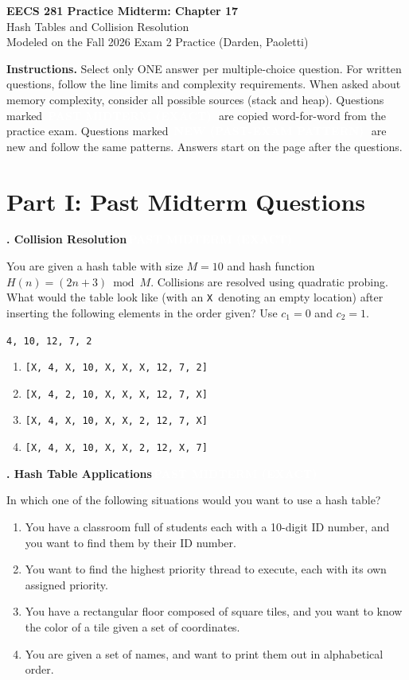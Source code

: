 \documentclass[11pt]{article}
\newcommand{\pasttag}{\colorbox{pastc}{\textcolor{white}{\scriptsize\textbf{\,PAST MIDTERM (EXACT)\,}}}}
\newcommand{\newtag}{\colorbox{newc}{\textcolor{white}{\scriptsize\textbf{\,NEW (PAST-EXAM PATTERN)\,}}}}
\newcommand{\X}{\texttt{X}}
\newcounter{q}
\newcommand{\question}[2]{\vspace{8pt}\refstepcounter{q}\textbf{\arabic{q}. #1}\hfill #2\par}
\begin{document}
\begin{center}
{\LARGE\bfseries EECS 281 Practice Midterm: Chapter 17}\\[3pt]
{\large Hash Tables and Collision Resolution}\\[3pt]
{\small Modeled on the Fall 2026 Exam 2 Practice (Darden, Paoletti)}
\end{center}

\textbf{Instructions.} Select only ONE answer per multiple-choice question. For written questions, follow the
line limits and complexity requirements. When asked about memory complexity, consider all possible sources (stack and heap).
Questions marked \pasttag\ are copied word-for-word from the practice exam. Questions marked \newtag\ are new and follow the same patterns.
Answers start on the page after the questions.

\section*{Part I: Past Midterm Questions}

\question{Collision Resolution}{\pasttag}
You are given a hash table with size $M = 10$ and hash function $H(n) = (2n + 3) \bmod M$. Collisions
are resolved using quadratic probing. What would the table look like (with an \X\ denoting an empty
location) after inserting the following elements in the order given? Use $c_1 = 0$ and $c_2 = 1$.

\centerline{\texttt{4, 10, 12, 7, 2}}
\begin{enumerate}
  \item \texttt{[X, 4, X, 10, X, X, X, 12, 7, 2]}
  \item \texttt{[X, 4, 2, 10, X, X, X, 12, 7, X]}
  \item \texttt{[X, 4, X, 10, X, X, 2, 12, 7, X]}
  \item \texttt{[X, 4, X, 10, X, X, 2, 12, X, 7]}
\end{enumerate}

\question{Hash Table Applications}{\pasttag}
In which one of the following situations would you want to use a hash table?
\begin{enumerate}
  \item You have a classroom full of students each with a 10-digit ID number, and you want to find them by their ID number.
  \item You want to find the highest priority thread to execute, each with its own assigned priority.
  \item You have a rectangular floor composed of square tiles, and you want to know the color of a tile given a set of coordinates.
  \item You are given a set of names, and want to print them out in alphabetical order.
\end{enumerate}
\end{document}
